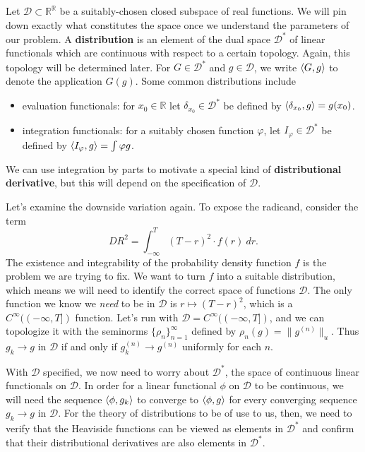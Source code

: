 \documentclass[12pt]{article}
\newcommand{\RR}{\mathbb{R}}
\newcommand{\DD}{\mathcal{D}}
\DeclarePairedDelimiter{\ip}{\langle}{\rangle}
\begin{document}
Let $\DD \subset \RR^\RR$ be a suitably-chosen closed subspace of real
functions. We will pin down exactly what constitutes the space once we
understand the parameters of our problem. A \textbf{distribution} is an element
of the dual space $\DD^*$ of linear functionals which are continuous with
respect to a certain topology. Again, this topology will be determined later.
For $G \in \DD^*$ and $g \in \DD$, we write $\ip{G, g}$ to denote the
application $G(g)$. Some common distributions include
\begin{itemize}
  \item evaluation functionals: for $x_0 \in \RR$ let
    $\delta_{x_0} \in \DD^*$ be defined by $\ip{\delta_{x_0}, g} = g(x_0)$.
  \item integration functionals: for a suitably chosen function $\varphi$, let
    $I_\varphi \in \DD^*$ be defined by $\ip{I_\varphi, g} = \int \varphi g$.
\end{itemize}
We can use integration by parts to motivate a special kind of
\textbf{distributional derivative}, but this will depend on the specification of
$\DD$.

Let's examine the downside variation again. To expose the radicand, consider the
term
\begin{equation*}
  \textit{DR}^2 = \int_{-\infty}^{T} (T-r)^2 \cdot f(r) \ dr.
\end{equation*}
The existence and integrability of the probability density function $f$ is the
problem we are trying to fix. We want to turn $f$ into a suitable distribution,
which means we will need to identify the correct space of functions $\DD$. The
only function we know we \emph{need} to be in $\DD$ is $r \mapsto (T-r)^2$,
which is a $C^{\infty}( (-\infty,  T])$ function. Let's run with $\DD =
C^\infty( (-\infty, T] )$, and we can topologize it with the seminorms
$\{\rho_n\}_{n = 1}^{\infty}$ defined by $\rho_n(g) = \| g^{(n)} \|_{u}$. Thus
$g_k \to g$ in $\DD$ if and only if $g_k^{(n)} \to g^{(n)}$ uniformly for each
$n$.

With $\DD$ specified, we now need to worry about $\DD^*$, the space of
continuous linear functionals on $\DD$. In order for a linear functional $\phi$
on $\DD$ to be continuous, we will need the sequence $\ip{\phi, g_k}$ to
converge to $\ip{\phi, g}$ for every converging sequence $g_k \to g$ in $\DD$.
For the theory of distributions to be of use to us, then, we need to verify that
the Heaviside functions can be viewed as elements in $\DD^*$ and confirm that
their distributional derivatives are also elements in $\DD^*$.
\end{document}
